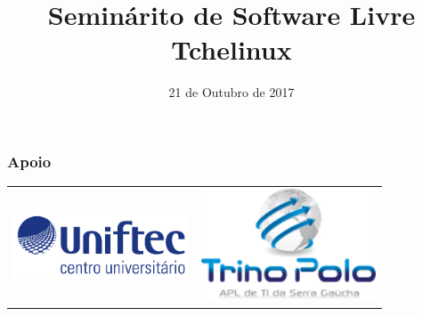 

\title{Seminárito de Software Livre Tchelinux}
\author{}
\date{21 de Outubro de 2017}




\coverframe


\begin{frame}
    \frametitle{Apoio}
\begin{center}
\begin{tabular}[h]{cc}
\includegraphics[width=5.2cm]{images/UNIFTEC.png} &
\includegraphics[width=5.2cm]{images/trinopolo.png}
\end{tabular}
\end{center}
\end{frame}

